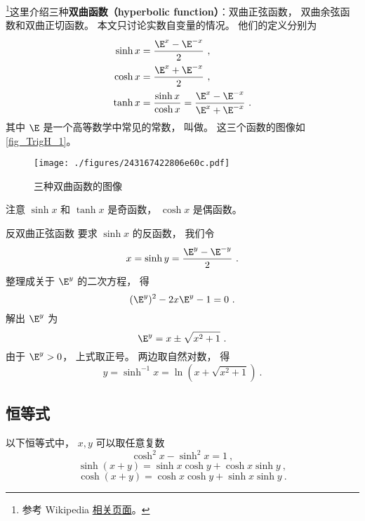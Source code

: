 

\footnote{参考 Wikipedia \href{https://en.wikipedia.org/wiki/Hyperbolic_functions}{相关页面}。}这里介绍三种\textbf{双曲函数（hyperbolic function）}：双曲正弦函数， 双曲余弦函数和双曲正切函数。 本文只讨论实数自变量的情况。 他们的定义分别为
\begin{align}
\sinh x &= \frac{\E^x - \E^{-x}}{2}~,\\
\label{eq_TrigH_1}
\cosh x &= \frac{\E^x + \E^{-x}}{2}~,\\
\tanh x &= \frac{\sinh x}{\cosh x} = \frac{\E^x - \E^{-x}}{\E^x + \E^{-x}}~.
\end{align}
其中 $\E$ 是一个高等数学中常见的常数， 叫做。 这三个函数的图像如\autoref{fig_TrigH_1}。

\begin{figure}[ht]
\centering
\texttt{[image: ./figures/243167422806e60c.pdf]}
\caption{三种双曲函数的图像} \label{fig_TrigH_1}
\end{figure}

注意 $\sinh x$ 和 $\tanh x$ 是奇函数， $\cosh x$ 是偶函数。

\begin{example}{反双曲正弦函数}\label{ex_TrigH_1}
要求 $\sinh x$ 的反函数， 我们令
\begin{equation}
x = \sinh y =  \frac{\E^y - \E^{-y}}{2}~.
\end{equation}
整理成关于 $\E^y$ 的二次方程， 得
\begin{equation}
(\E^y)^2 - 2x \E^y - 1 = 0~.
\end{equation}
解出 $\E^y$ 为
\begin{equation}
\E^y = x \pm \sqrt{x^2 + 1}~.
\end{equation}
由于 $\E^y > 0$， 上式取正号。 两边取自然对数， 得
\begin{equation}
y = \sinh^{-1} x = \ln(x + \sqrt{x^2 + 1})~.
\end{equation}
\end{example}

\subsection{恒等式}
以下恒等式中， $x,y$ 可以取任意复数
\begin{equation}
\cosh^2 x - \sinh^2 x = 1~,
\end{equation}
\begin{equation}
\sinh(x+y) = \sinh x \cosh y + \cosh x \sinh y~,
\end{equation}
\begin{equation}
\cosh(x+y) = \cosh x \cosh y + \sinh x \sinh y~.
\end{equation}

